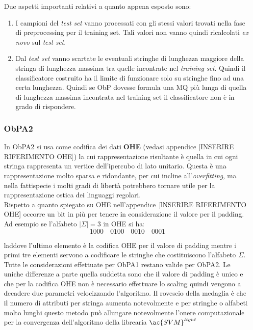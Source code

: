 Due aspetti importanti relativi a quanto appena esposto sono:
\begin{enumerate}
\item I campioni del \textit{test set} vanno processati con gli stessi valori trovati nella fase di preprocessing per il training set. Tali valori non vanno quindi ricalcolati \textit{ex novo} sul \textit{test set}.
\item Dal \textit{test set} vanno scartate le eventuali stringhe di lunghezza maggiore della stringa di lunghezza massima tra quelle incontrate nel \textit{training set}. Quindi il classificatore costruito ha il limite di funzionare solo su stringhe fino ad una certa lunghezza. Quindi se \ac{ObP} dovesse formula una \ac{MQ} più lunga di quella di lunghezza massima incontrata nel \ac{training set} il classificatore non è in grado di rispondere. 
\end {enumerate}

\subsubsection{ObPA2}
In \ac{ObPA}2 si usa come codifica dei dati \textbf{OHE} (vedasi appendice [INSERIRE RIFERIMENTO OHE]) la cui rappresentazione risultante è quella in cui ogni stringa rappresenta un vertice dell'ipercubo di lato unitario. Questa è una rappresentazione molto sparsa e ridondante, per cui incline all'\textit{overfitting}, ma nella fattispecie i molti gradi di libertà potrebbero tornare utile per la rappresentazione ostica dei linguaggi regolari.\\
Rispetto a quanto spiegato su OHE nell'appendice [INSERIRE RIFERIMENTO OHE] occorre un bit in più per tenere in considerazione il valore per il padding. Ad esempio se l'alfabeto $|\Sigma|=3$ in OHE si ha:
\begin{equation*}
1000 \quad 0100 \quad 0010 \quad 0001
\end{equation*} 

laddove l'ultimo elemento è la codifica OHE per il valore di padding mentre i primi tre elementi servono a codificare le stringhe che costituiscono l'alfabeto $\Sigma$.\\
Tutte le considerazioni effettuate per \ac{ObPA}1 restano valide per \ac{ObPA}2. Le uniche differenze a parte quella suddetta sono che il valore di padding è unico e che per la codifica OHE non è necessario effettuare lo scaling quindi vengono a decadere due parametri velocizzando l'algoritmo. Il rovescio della medaglia è che il numero di attributi per stringa aumenta notevolmente e per stringhe o alfabeti molto lunghi questo metodo può allungare notevolmente l'onere computazionale per la convergenza dell'algoritmo  della librearia $\ac{SVM}^{light}$  

